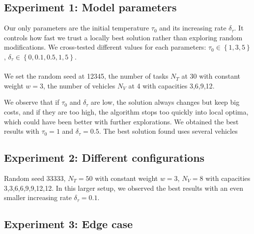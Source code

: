 \documentclass[11pt]{article}
\begin{document}
\subsection{Experiment 1: Model parameters}

Our only parameters are the initial temperature $\tau_0$ and its increasing rate $\delta_\tau$. It controls how fast we trust a locally best solution rather than exploring random modifications. We cross-tested different values for each parameters: $\tau_0\in \left\lbrace 1,3,5\right\rbrace$, $\delta_\tau\in \left\lbrace 0,0.1,0.5,1,5 \right\rbrace$.\\
\\
We set the random seed at 12345, the number of tasks $N_T$ at 30 with constant weight $w=3$, the number of vehicles $N_V$ at 4 with capacities {3,6,9,12}.

We observe that if $\tau_0$ and $\delta_\tau$ are low, the solution always changes but keep big costs, and if they are too high, the algorithm stops too quickly into local optima, which could have been better with further explorations. We obtained the best results with $\tau_0=1$ and $\delta_\tau=0.5$. The best solution found uses several vehicles

\subsection{Experiment 2: Different configurations}

Random seed 33333, $N_T=50$ with constant weight $w=3$, $N_V=8$ with capacities {3,3,6,6,9,9,12,12}. In this larger setup, we observed the best results with an even smaller increasing rate $\delta_\tau=0.1$. 

\subsection{Experiment 3: Edge case}
\end{document}
